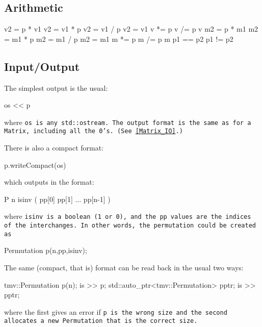 \subsection{Arithmetic}
\label{Permutation_Arithmetic}

\begin{tmvcode}
v2 = p * v1
v2 = v1 * p
v2 = v1 / p
v2 = v1 %
v *= p
v /= p
v %
m2 = p * m1
m2 = m1 * p
m2 = m1 / p
m2 = m1 %
m *= p
m /= p
m %
p1 == p2
p1 != p2
\end{tmvcode}

\subsection{Input/Output}
\label{Permutation_IO}

The simplest output is the usual:
\begin{tmvcode}
os << p
\end{tmvcode}
where \tt{os} is any \tt{std::ostream}.
The output format is the same as for a \tt{Matrix}, including all the 0's.
(See \ref{Matrix_IO}.)

There is also a compact format:
\begin{tmvcode}
p.writeCompact(os)
\end{tmvcode}
which outputs in the format:
\begin{tmvcode}
P n isinv ( pp[0]  pp[1]  ...  pp[n-1] )
\end{tmvcode}
where \tt{isinv} is a boolean (1 or 0), and the \tt{pp} values are the 
indices of the interchanges.
In other words, the permutation could be created as
\begin{tmvcode}
Permutation p(n,pp,isinv);
\end{tmvcode}

The same (compact, that is) format can be read back in the usual two ways:
\begin{tmvcode}
tmv::Permutation p(n);
is >> p;
std::auto_ptr<tmv::Permutation> pptr;
is >> pptr;
\end{tmvcode}
where the first gives an error if \tt{p} is the wrong size and the second allocates
a new \tt{Permutation} that is the correct size.


